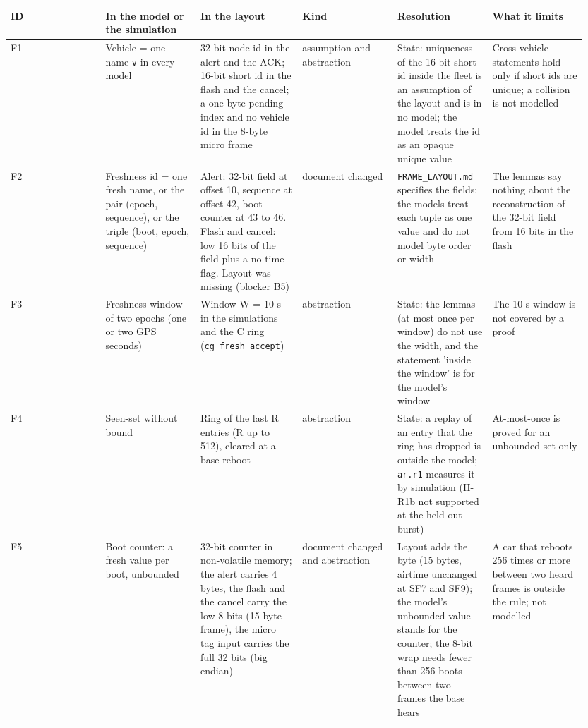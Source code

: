 {\scriptsize\raggedright
\begin{longtable}{p{0.158\linewidth}p{0.158\linewidth}p{0.158\linewidth}p{0.158\linewidth}p{0.158\linewidth}p{0.158\linewidth}}
\toprule
ID & In the model or the simulation & In the layout & Kind & Resolution & What it limits \\
\midrule
\endhead
F1 & Vehicle = one name \texttt{v} in every model & 32-bit node id in the alert and the ACK; 16-bit short id in the flash and the cancel; a one-byte pending index and no vehicle id in the 8-byte micro frame & assumption and abstraction & State: uniqueness of the 16-bit short id inside the fleet is an assumption of the layout and is in no model; the model treats the id as an opaque unique value & Cross-vehicle statements hold only if short ids are unique; a collision is not modelled \\
F2 & Freshness id = one fresh name, or the pair (epoch, sequence), or the triple (boot, epoch, sequence) & Alert: 32-bit field at offset 10, sequence at offset 42, boot counter at 43 to 46. Flash and cancel: low 16 bits of the field plus a no-time flag. Layout was missing (blocker B5) & document changed & \texttt{FRAME\_LAYOUT.md} specifies the fields; the models treat each tuple as one value and do not model byte order or width & The lemmas say nothing about the reconstruction of the 32-bit field from 16 bits in the flash \\
F3 & Freshness window of two epochs (one or two GPS seconds) & Window W = 10 s in the simulations and the C ring (\texttt{cg\_fresh\_accept}) & abstraction & State: the lemmas (at most once per window) do not use the width, and the statement 'inside the window' is for the model's window & The 10 s window is not covered by a proof \\
F4 & Seen-set without bound & Ring of the last R entries (R up to 512), cleared at a base reboot & abstraction & State: a replay of an entry that the ring has dropped is outside the model; \texttt{ar.r1} measures it by simulation (H-R1b not supported at the held-out burst) & At-most-once is proved for an unbounded set only \\
F5 & Boot counter: a fresh value per boot, unbounded & 32-bit counter in non-volatile memory; the alert carries 4 bytes, the flash and the cancel carry the low 8 bits (15-byte frame), the micro tag input carries the full 32 bits (big endian) & document changed and abstraction & Layout adds the byte (15 bytes, airtime unchanged at SF7 and SF9); the model's unbounded value stands for the counter; the 8-bit wrap needs fewer than 256 boots between two frames the base hears & A car that reboots 256 times or more between two heard frames is outside the rule; not modelled \\

\end{longtable}}
